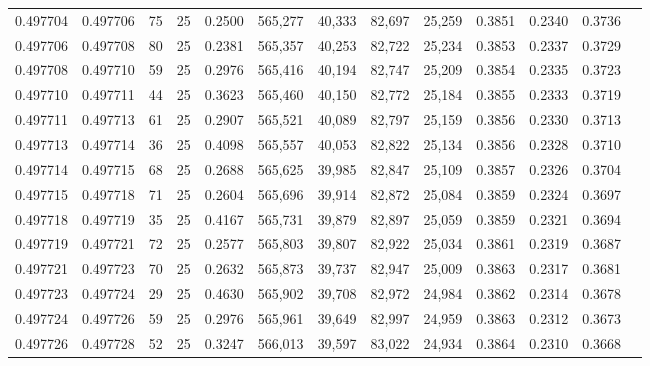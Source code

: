 \begin{tabular}{rrrrrrrrrrrrr}
0.497704 & 0.497706 &    75 &  25 &                                     0.2500 & 565,277 &  40,333 &  82,697 &  25,259 & 0.3851 & 0.2340 & 0.3736 \\
0.497706 & 0.497708 &    80 &  25 &                                     0.2381 & 565,357 &  40,253 &  82,722 &  25,234 & 0.3853 & 0.2337 & 0.3729 \\
0.497708 & 0.497710 &    59 &  25 &                                     0.2976 & 565,416 &  40,194 &  82,747 &  25,209 & 0.3854 & 0.2335 & 0.3723 \\
0.497710 & 0.497711 &    44 &  25 &                                     0.3623 & 565,460 &  40,150 &  82,772 &  25,184 & 0.3855 & 0.2333 & 0.3719 \\
0.497711 & 0.497713 &    61 &  25 &                                     0.2907 & 565,521 &  40,089 &  82,797 &  25,159 & 0.3856 & 0.2330 & 0.3713 \\
0.497713 & 0.497714 &    36 &  25 &                                     0.4098 & 565,557 &  40,053 &  82,822 &  25,134 & 0.3856 & 0.2328 & 0.3710 \\
0.497714 & 0.497715 &    68 &  25 &                                     0.2688 & 565,625 &  39,985 &  82,847 &  25,109 & 0.3857 & 0.2326 & 0.3704 \\
0.497715 & 0.497718 &    71 &  25 &                                     0.2604 & 565,696 &  39,914 &  82,872 &  25,084 & 0.3859 & 0.2324 & 0.3697 \\
0.497718 & 0.497719 &    35 &  25 &                                     0.4167 & 565,731 &  39,879 &  82,897 &  25,059 & 0.3859 & 0.2321 & 0.3694 \\
0.497719 & 0.497721 &    72 &  25 &                                     0.2577 & 565,803 &  39,807 &  82,922 &  25,034 & 0.3861 & 0.2319 & 0.3687 \\
0.497721 & 0.497723 &    70 &  25 &                                     0.2632 & 565,873 &  39,737 &  82,947 &  25,009 & 0.3863 & 0.2317 & 0.3681 \\
0.497723 & 0.497724 &    29 &  25 &                                     0.4630 & 565,902 &  39,708 &  82,972 &  24,984 & 0.3862 & 0.2314 & 0.3678 \\
0.497724 & 0.497726 &    59 &  25 &                                     0.2976 & 565,961 &  39,649 &  82,997 &  24,959 & 0.3863 & 0.2312 & 0.3673 \\
0.497726 & 0.497728 &    52 &  25 &                                     0.3247 & 566,013 &  39,597 &  83,022 &  24,934 & 0.3864 & 0.2310 & 0.3668 \\

\end{tabular}
